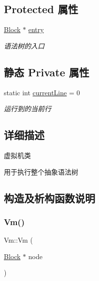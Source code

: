 \subsection*{Protected 属性}
\begin{DoxyCompactItemize}
\item 
\mbox{\label{class_vm_ab5aae972ea15ddfd01362e27ed797a51}} 
\hyperlink{class_block}{Block} $\ast$ \hyperlink{class_vm_ab5aae972ea15ddfd01362e27ed797a51}{entry}
\begin{DoxyCompactList}\small\item\em 语法树的入口 \end{DoxyCompactList}\end{DoxyCompactItemize}
\subsection*{静态 Private 属性}
\begin{DoxyCompactItemize}
\item 
\mbox{\label{class_vm_acfa435ede93d1ba8fe2250fd3469de15}} 
static int \hyperlink{class_vm_acfa435ede93d1ba8fe2250fd3469de15}{current\+Line} = 0
\begin{DoxyCompactList}\small\item\em 运行到的当前行 \end{DoxyCompactList}\end{DoxyCompactItemize}


\subsection{详细描述}
虚拟机类 

用于执行整个抽象语法树 

\subsection{构造及析构函数说明}
\mbox{\label{class_vm_a4a37106b5b5b9382baa79dea901db8ba}} 
\subsubsection{\texorpdfstring{Vm()}{Vm()}}
{\footnotesize\ttfamily Vm\+::\+Vm (\begin{DoxyParamCaption}\item[{\hyperlink{class_block}{Block} $\ast$}]{node }\end{DoxyParamCaption})}


